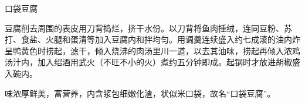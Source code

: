 \begin{recipe}{口袋豆腐}

\ingredients




\cooking

豆腐削去周围的表皮用刀背捣烂，挤干水份。以刀背将鱼肉捶绒，连同豆粉、苏打、食盐、火腿和蛋清等加入豆腐内和拌均匀。用调羹连续盛入约七成滚的油内炸呈鸭黄色时捞起，滤干，倾入烧沸的肉汤里川一道，以去其油味，捞起再倾入浓鸡汤汁内，加入绍酒用武火（不旺不小的火）煮约五分钟即成。起锅时才放进胡椒盛入碗内。

\notes

味浓厚鲜美，富营养，内含浆包细嫩化渣，状似米口袋，故名“口袋豆腐”。

\end{recipe}

